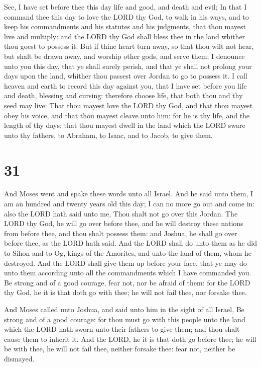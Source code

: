  See, I have set before thee this day life and good, and
death and evil;  In that I command thee this day to love
the LORD thy God, to walk in his ways, and to keep his commandments and
his statutes and his judgments, that thou mayest live and multiply: and
the LORD thy God shall bless thee in the land whither thou goest to
possess it.  But if thine heart turn away, so that thou
wilt not hear, but shalt be drawn away, and worship other gods, and
serve them;  I denounce unto you this day, that ye shall
surely perish, and that ye shall not prolong your days upon the land,
whither thou passest over Jordan to go to possess it.  I
call heaven and earth to record this day against you, that I have set
before you life and death, blessing and cursing: therefore choose life,
that both thou and thy seed may live:  That thou mayest
love the LORD thy God, and that thou mayest obey his voice, and that
thou mayest cleave unto him: for he is thy life, and the length of thy
days: that thou mayest dwell in the land which the LORD sware unto thy
fathers, to Abraham, to Isaac, and to Jacob, to give them.

\hypertarget{section-30}{%
\section{31}\label{section-30}}

 And Moses went and spake these words unto all Israel.
 And he said unto them, I am an hundred and twenty years old
this day; I can no more go out and come in: also the LORD hath said unto
me, Thou shalt not go over this Jordan.  The LORD thy God,
he will go over before thee, and he will destroy these nations from
before thee, and thou shalt possess them: and Joshua, he shall go over
before thee, as the LORD hath said.  And the LORD shall do
unto them as he did to Sihon and to Og, kings of the Amorites, and unto
the land of them, whom he destroyed.  And the LORD shall
give them up before your face, that ye may do unto them according unto
all the commandments which I have commanded you.  Be strong
and of a good courage, fear not, nor be afraid of them: for the LORD thy
God, he it is that doth go with thee; he will not fail thee, nor forsake
thee.

 And Moses called unto Joshua, and said unto him in the
sight of all Israel, Be strong and of a good courage: for thou must go
with this people unto the land which the LORD hath sworn unto their
fathers to give them; and thou shalt cause them to inherit it.
 And the LORD, he it is that doth go before thee; he will be
with thee, he will not fail thee, neither forsake thee: fear not,
neither be dismayed.

